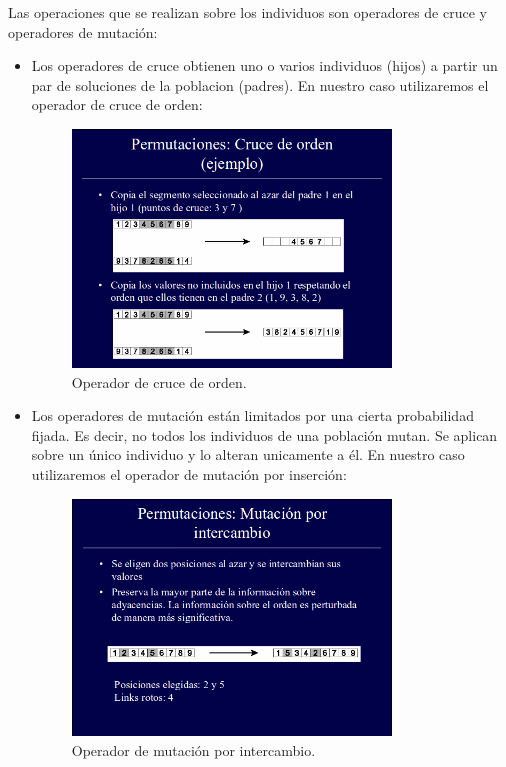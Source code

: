 \documentclass{article}
\begin{document}
Las operaciones que se realizan sobre los individuos son operadores de cruce y operadores de mutación:
\begin{itemize}
	\item Los operadores de cruce obtienen uno o varios individuos (hijos) a partir un par de soluciones de la poblacion (padres). En nuestro caso utilizaremos el operador de cruce de orden:
	
	\begin{figure}[H]
		\centering
		\includegraphics[width=0.8\textwidth]{report/imag1.png}
		\caption{Operador de cruce de orden.}
	\end{figure}
	
	\item Los operadores de mutación están limitados por una cierta probabilidad fijada. Es decir, no todos los individuos de una población mutan. Se aplican sobre un único individuo y lo alteran unicamente a él. En nuestro caso utilizaremos el operador de mutación por inserción:
	
	\begin{figure}[H]
		\centering
		\includegraphics[width=0.8\textwidth]{report/imag2.png}
		\caption{Operador de mutación por intercambio.}
	\end{figure}
	
\end{itemize}
 
\end{document}
